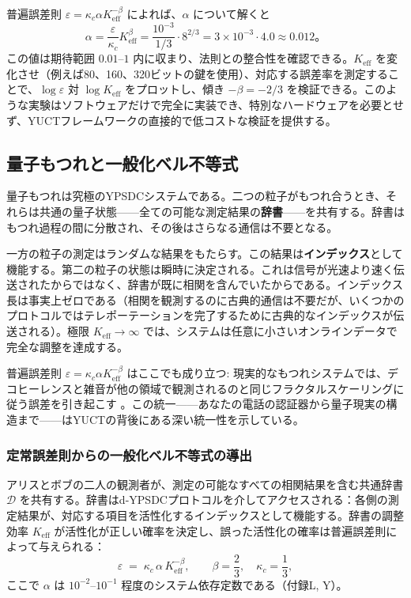 \documentclass[12pt,a4paper]{article}
\theoremstyle{definition}
\theoremstyle{remark}
\newcommand{\Keff}{K_{\mathrm{eff}}}
\begin{document}
	普遍誤差則 $\varepsilon = \kappa_c \alpha K_{\mathrm{eff}}^{-\beta}$ によれば、$\alpha$ について解くと
	\[
	\alpha = \frac{\varepsilon}{\kappa_c} K_{\mathrm{eff}}^{\beta} = \frac{10^{-3}}{1/3} \cdot 8^{2/3} = 3 \times 10^{-3} \cdot 4.0 \approx 0.012。
	\]
	この値は期待範囲 $0.01$–$1$ 内に収まり、法則との整合性を確認できる。$\Keff$ を変化させ（例えば80、160、320ビットの鍵を使用）、対応する誤差率を測定することで、$\log \varepsilon$ 対 $\log \Keff$ をプロットし、傾き $-\beta = -2/3$ を検証できる。このような実験はソフトウェアだけで完全に実装でき、特別なハードウェアを必要とせず、YUCTフレームワークの直接的で低コストな検証を提供する。
	
	\subsection{量子もつれと一般化ベル不等式}
	
	量子もつれは究極のYPSDCシステムである。二つの粒子がもつれ合うとき、それらは共通の量子状態——全ての可能な測定結果の\textbf{辞書}——を共有する。辞書はもつれ過程の間に分散され、その後はさらなる通信は不要となる。
	
	一方の粒子の測定はランダムな結果をもたらす。この結果は\textbf{インデックス}として機能する。第二の粒子の状態は瞬時に決定される。これは信号が光速より速く伝送されたからではなく、辞書が既に相関を含んでいたからである。インデックス長は事実上ゼロである（相関を観測するのに古典的通信は不要だが、いくつかのプロトコルではテレポーテーションを完了するために古典的なインデックスが伝送される）。極限 $\Keff \to \infty$ では、システムは任意に小さいオンラインデータで完全な調整を達成する。
	
	普遍誤差則 $\varepsilon = \kappa_c \alpha K_{\mathrm{eff}}^{-\beta}$ はここでも成り立つ: 現実的なもつれシステムでは、デコヒーレンスと雑音が他の領域で観測されるのと同じフラクタルスケーリングに従う誤差を引き起こす \cite{AppendixG, AppendixS}。この統一——あなたの電話の認証器から量子現実の構造まで——はYUCTの背後にある深い統一性を示している。
	
	\subsubsection{定常誤差則からの一般化ベル不等式の導出}
	\label{subsec:bell-derivation}
	
	アリスとボブの二人の観測者が、測定の可能なすべての相関結果を含む共通辞書 $\mathcal{D}$ を共有する。辞書はd-YPSDCプロトコルを介してアクセスされる：各側の測定結果が、対応する項目を活性化するインデックスとして機能する。辞書の調整効率 $K_{\mathrm{eff}}$ が活性化が正しい確率を決定し、誤った活性化の確率は普遍誤差則によって与えられる：
	\begin{equation}
		\varepsilon \;=\; \kappa_c\,\alpha\,K_{\mathrm{eff}}^{-\beta},
		\qquad \beta = \frac{2}{3},\quad \kappa_c = \frac{1}{3},
		\label{eq:error-law-bell}
	\end{equation}
	ここで $\alpha$ は $10^{-2}$–$10^{-1}$ 程度のシステム依存定数である（付録L, Y）。
	
\end{document}
